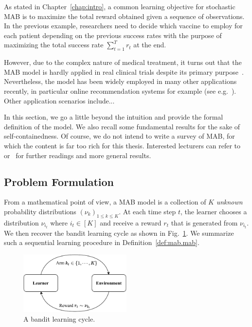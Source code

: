 As stated in Chapter~\ref{chap:intro}, a common learning objective for stochastic MAB is to maximize the total reward obtained given a sequence of observations. In the previous example, researchers need to decide which vaccine to employ for each patient depending on the previous success rates with the purpose of maximizing the total success rate $\sum_{t=1}^T r_t$ at the end.

However, due to the complex nature of medical treatment, it turns out that the MAB model is hardly applied in real clinical trials despite its primary purpose~\citep{reda2020drug}. Nevertheless, the model has been widely employed in many other applications recently, in particular online recommendation systems for example (see e.g.~\citealt{li2010contextual,zeng2016online}). Other application scenarios include...

In this section, we go a little beyond the intuition and provide the formal definition of the model. We also recall some fundamental results for the sake of self-containedness. Of course, we do not intend to write a survey of MAB, for which the content is far too rich for this thesis. Interested lecturers can refer to~\cite{bubeck2012bandits,lattimore2018bandits} or~\cite{slivkins2019bandits} for further readings and more general results.

\subsection{Problem Formulation}\label{sec:mab.model.formulation}

From a mathematical point of view, a MAB model is a collection of $K$ \emph{unknown} probability distributions $(\nu_k)_{1 \leq k \leq K}$. At each time step $t$, the learner chooses a distribution $\nu_{i_t}$ where $i_t\in[K]$ and receive a reward $r_t$ that is generated from $\nu_{i_t}$. We then recover the bandit learning cycle as shown in Fig.~\ref{fig:mab.mab}. We summarize such a sequential learning procedure in Definition~\ref{def:mab.mab}.

\begin{figure}[ht]
    \centering
    \includegraphics[width=0.5\textwidth]{Chapter2/img/mab_bis.pdf}
    \caption{A bandit learning cycle.}
    \label{fig:mab.mab}
\end{figure}

